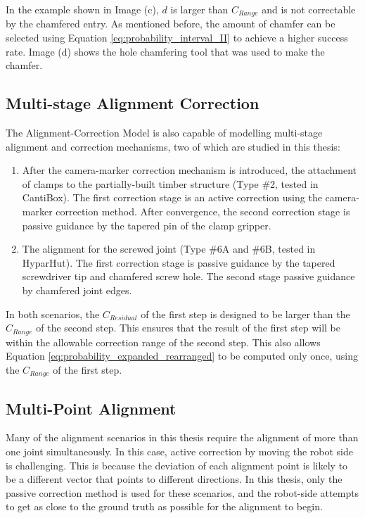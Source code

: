 In the example shown in Image (c), $d$ is larger than $C_{Range}$ and is not correctable by the chamfered entry. As mentioned before, the amount of chamfer can be selected using Equation \ref{eq:probability_interval_II} to achieve a higher success rate. Image (d) shows the hole chamfering tool that was used to make the chamfer.



\subsection{Multi-stage Alignment Correction}

The Alignment-Correction Model is also capable of modelling multi-stage alignment and correction mechanisms, two of which are studied in this thesis:

\begin{enumerate}
	\item After the camera-marker correction mechanism is introduced, the attachment of clamps to the partially-built timber structure (Type \#2, tested in CantiBox). The first correction stage is an active correction using the camera-marker correction method. After convergence, the second correction stage is passive guidance by the tapered pin of the clamp gripper.

	\item The alignment for the screwed joint (Type \#6A and \#6B, tested in HyparHut). The first correction stage is passive guidance by the tapered screwdriver tip and chamfered screw hole. The second stage passive guidance by chamfered joint edges. 

\end{enumerate}
In both scenarios, the $C_{Residual}$ of the first step is designed to be larger than the $C_{Range}$ of the second step. This ensures that the result of the first step will be within the allowable correction range of the second step. This also allows Equation \ref{eq:probability_expanded_rearranged} to be computed only once, using the $C_{Range}$ of the first step.

\subsection{Multi-Point Alignment}

Many of the alignment scenarios in this thesis require the alignment of more than one joint simultaneously. In this case, active correction by moving the robot side is challenging. This is because the deviation of each alignment point is likely to be a different vector that points to different directions. In this thesis, only the passive correction method is used for these scenarios, and the robot-side attempts to get as close to the ground truth as possible for the alignment to begin. 

